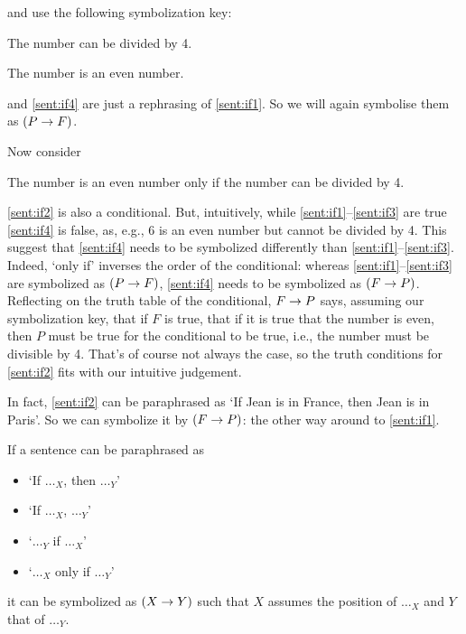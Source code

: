 and use the following symbolization key:
	\begin{ekey}
		\item[P] The number can be divided by 4.
		\item[F] The number is an even number.
	\end{ekey}
 and \ref{sent:if4} are just a rephrasing of \cref{sent:if1}. So we will again symbolise them as $(P\rightarrow F)$.

Now consider
\begin{samplesent}
		\item\label{sent:if2} The number is an even number only if the number can be divided by 4.
\end{samplesent}

\cref{sent:if2} is also a conditional. But, intuitively, while \cref{sent:if1}--\cref{sent:if3} are true \cref{sent:if4} is false, as, e.g., 6 is an even number but cannot be divided by 4. This suggest that \cref{sent:if4} needs to be symbolized differently than \cref{sent:if1}--\cref{sent:if3}. Indeed, `only if' inverses the order of the conditional: whereas \cref{sent:if1}--\cref{sent:if3} are symbolized as $(P\rightarrow F)$, \cref{sent:if4} needs to be symbolized as $(F\rightarrow P)$. Reflecting on the truth table of the conditional, $F\rightarrow P$ says, assuming our symbolization key, that if $F$ is true, that if it is true that the number is even, then $P$ must be true for the conditional to be true, i.e., the number must be divisible by 4. That's of course not always the case, so the truth conditions for \cref{sent:if2} fits with our intuitive judgement.


In fact, \cref{sent:if2} can be paraphrased as `If Jean is in France, then Jean is in Paris'. So we can symbolize it by $(F \rightarrow P)$: the other way around to \cref{sent:if1}.
	\begin{highlighted}
	 If a sentence can be paraphrased as \begin{itemize}
	 \item `If $\ldots_{X}$, then $\ldots_{Y}$'
	 \item `If $\ldots_{X}$, $\ldots_{Y}$'
	 \item `$\ldots_{Y}$ if $\ldots_{X}$'
	 \item `$\ldots_{X}$ only if $\ldots_{Y}$'
	 \end{itemize} it can be symbolized as $(X\rightarrow Y)$ such that $X$ assumes the position of $\ldots_X$ and $Y$ that of $\ldots_Y$.
	\end{highlighted}
	
